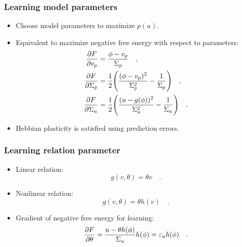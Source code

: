 \documentclass[aspectratio=169]{beamer}
\begin{document}
\begin{frame}
  \frametitle{Learning model parameters}
  \begin{itemize}
    \item<1-> Choose model parameters to maximize $p(u)$.
    \item<2-> Equivalent to maximize negative free energy with respect to parameters:
      \begin{align}
        \label{eq:gradient_mean_prior}
        \pdv{F}{v_p} & = \frac{\phi - v_p}{\Sigma_p}
        \quad , \\
        \label{eq:gradient_variance_prior}
        \pdv{F}{\Sigma_p} & = \frac{1}{2} \Bigg( \frac{(\phi - v_p)^2}{\Sigma_p^2} - \frac{1}{\Sigma_p} \Bigg)
        \quad , \\
        \label{eq:gradient_variance_stimulus}
        \pdv{F}{\Sigma_u} & = \frac{1}{2} \Bigg( \frac{(u - g(\phi))^2}{\Sigma_u^2} - \frac{1}{\Sigma_u} \Bigg)
        \quad .
      \end{align}
    \item<3-> Hebbian plasticity is satisfied using prediction errors.
  \end{itemize}
\end{frame}

\begin{frame}
  \frametitle{Learning relation parameter}
  \begin{itemize}
    \item<1-> Linear relation:
      \begin{equation}
        \label{eq:relation_linear}
        g(v, \theta) = \theta v
        \quad .
      \end{equation}
    \item<2-> Nonlinear relation:
      \begin{equation}
        \label{eq:relation_nonlinear}
        g(v, \theta) = \theta h(v)
        \quad .
      \end{equation}
    \item<3-> Gradient of negative free energy for learning:
      \begin{equation}
        \label{eq:relation_nonlinear}
        \pdv{F}{\theta} = \frac{u - \theta h(\phi)}{\Sigma_u} h(\phi) = \varepsilon_u h(\phi)
        \quad .
      \end{equation}
  \end{itemize}
\end{frame}
\end{document}
